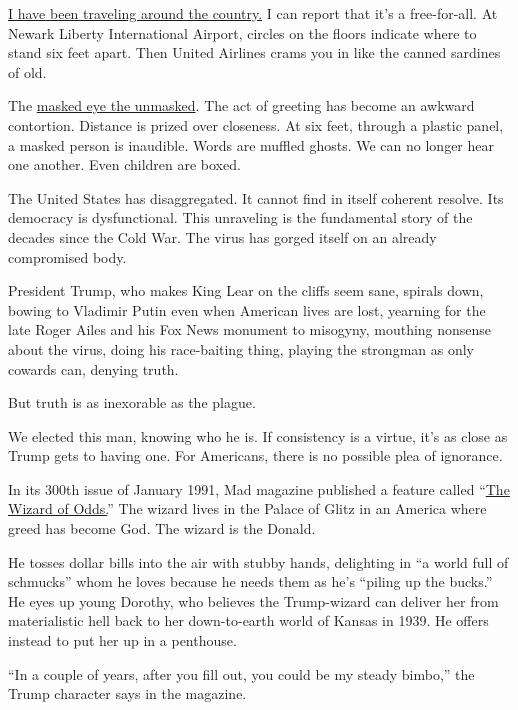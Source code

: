 \href{https://www.nytimes.com/2020/06/26/opinion/let-freedom-ring-from-georgia.html}{I
have been traveling around the country.} I can report that it's a
free-for-all. At Newark Liberty International Airport, circles on the
floors indicate where to stand six feet apart. Then United Airlines
crams you in like the canned sardines of old.

The
\href{https://www.nytimes.com/2020/06/30/style/mask-america-freedom-coronavirus.html}{masked
eye the unmasked}. The act of greeting has become an awkward contortion.
Distance is prized over closeness. At six feet, through a plastic panel,
a masked person is inaudible. Words are muffled ghosts. We can no longer
hear one another. Even children are boxed.

The United States has disaggregated. It cannot find in itself coherent
resolve. Its democracy is dysfunctional. This unraveling is the
fundamental story of the decades since the Cold War. The virus has
gorged itself on an already compromised body.

President Trump, who makes King Lear on the cliffs seem sane, spirals
down, bowing to Vladimir Putin even when American lives are lost,
yearning for the late Roger Ailes and his Fox News monument to misogyny,
mouthing nonsense about the virus, doing his race-baiting thing, playing
the strongman as only cowards can, denying truth.

But truth is as inexorable as the plague.

We elected this man, knowing who he is. If consistency is a virtue, it's
as close as Trump gets to having one. For Americans, there is no
possible plea of ignorance.

In its 300th issue of January 1991, Mad magazine published a feature
called
``\href{https://www.comicartfans.com/gallerypiece.asp?piece=1306080}{The
Wizard of Odds.}'' The wizard lives in the Palace of Glitz in an America
where greed has become God. The wizard is the Donald.

He tosses dollar bills into the air with stubby hands, delighting in ``a
world full of schmucks'' whom he loves because he needs them as he's
``piling up the bucks.'' He eyes up young Dorothy, who believes the
Trump-wizard can deliver her from materialistic hell back to her
down-to-earth world of Kansas in 1939. He offers instead to put her up
in a penthouse.

``In a couple of years, after you fill out, you could be my steady
bimbo,'' the Trump character says in the magazine.

